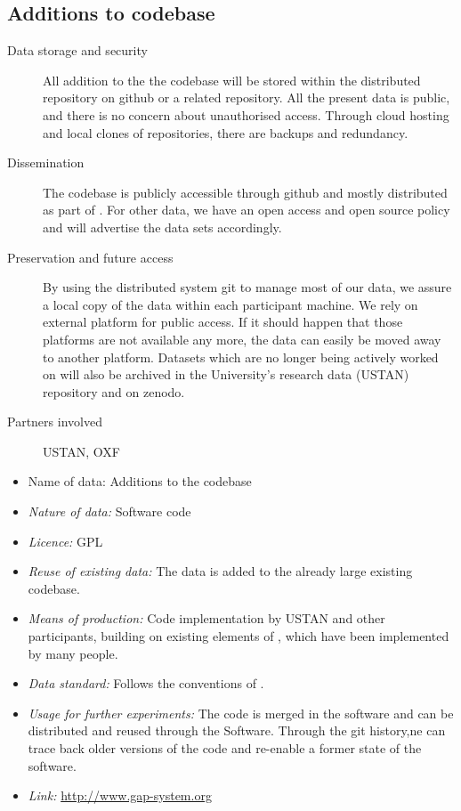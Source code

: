 \documentclass{deliverablereport}
\begin{document}
\subsection{Additions to \GAP codebase}


\begin{description}
\item[Data storage and security] All addition to the the \GAP codebase will be stored within the distributed \GAP repository on github or a related repository. All the present data is public, and there is no concern about unauthorised access. Through cloud hosting and local clones of repositories, there are backups and redundancy.\label{GAPsec}
\item[Dissemination] The \GAP codebase is publicly accessible through github and mostly distributed as part of \GAP. For other data, we have an open access and open source policy and will advertise the data sets accordingly.
\label{GAPdiss}

\item[Preservation and future access] By using the distributed system git to manage most of our data, we assure a local copy of the data within each participant machine. We rely on external platform for public access. If it should happen that those platforms are not available any more, the data can easily be moved away to another platform. Datasets which are no longer being actively worked on will also be archived in the University's  research data (USTAN) repository and on zenodo.\label{GAPpres}
\item[Partners involved] USTAN, OXF
\end{description}


\begin{itemize}


\item{Name of data:} Additions to the \GAP codebase
\item\textit{Nature of data:} Software code
\item\textit{Licence:} GPL
\item\textit{Reuse of existing data:} The data is added to the already large existing \GAP codebase.
\item\textit{Means of production:} Code implementation by USTAN and other participants, building on existing elements of \GAP, which have been implemented by many people.
\item\textit{Data standard:} Follows the conventions of \GAP.
\item\textit{Usage for further experiments:} The code is merged in the software and can be distributed and reused through the Software. Through the git history,ne can trace back older versions of the code and re-enable a former state of the software.
\item\textit{Link:} \href{http://www.gap-system.org}{http://www.gap-system.org}
\end{itemize}
\end{document}
